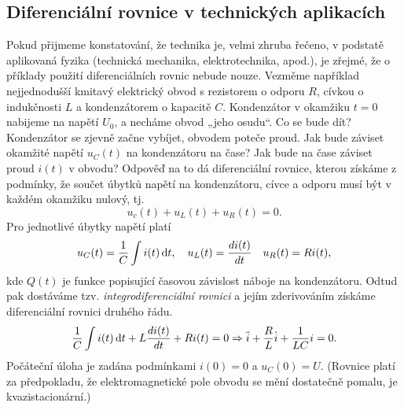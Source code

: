     \subsection{Diferenciální rovnice v technických aplikacích}
      Pokud přijmeme konstatování, že technika je, velmi zhruba řečeno, v podstatě aplikovaná fyzika
      (technická mechanika, elektrotechnika, apod.), je zřejmé, že o příklady použití
      diferenciálních rovnic nebude nouze. Vezměme například nejjednodušší kmitavý elektrický obvod
      s rezistorem o odporu \(R\), cívkou o indukčnosti \(L\) a kondenzátorem o kapacitě \(C\).
      Kondenzátor v okamžiku \(t = 0\) nabijeme na napětí \(U_0\), a necháme obvod „jeho osudu“. Co
      se bude dít? Kondenzátor se zjevně začne vybíjet, obvodem poteče proud. Jak bude záviset
      okamžité napětí \(u_C(t)\) na kondenzátoru na čase? Jak bude na čase záviset proud \(i(t)\) v
      obvodu? Odpověď na to dá diferenciální rovnice, kterou získáme z podmínky, že součet úbytků
      napětí na kondenzátoru, cívce a odporu musí být v každém okamžiku nulový, tj.
      \begin{equation*}
        u_c(t) + u_L(t) + u_R(t) = 0.
      \end{equation*}      
      Pro jednotlivé úbytky napětí platí
      \begin{gather*}
        u_C(t) = \dfrac{1}{C}\int i(t)\mathop{}\!\mathrm{d}t, \quad  u_L(t) = \dfrac{d i(t)}{d t} \quad u_R(t) = Ri(t),
      \end{gather*}
      kde \(Q(t)\) je funkce popisující časovou závislost náboje na kondenzátoru. Odtud pak 
      dostáváme tzv. \emph{integrodiferenciální rovnici} a jejím zderivováním získáme diferenciální 
      rovnici druhého řádu.
      \begin{equation*}
        \dfrac{1}{C}\int i(t)\mathop{}\!\mathrm{d}t + L\dfrac{d i(t)}{d t} + Ri(t) = 0 \Rightarrow
        \ddot{i} + \dfrac{R}{L}\dot{i} + \dfrac{1}{LC}i = 0.
      \end{equation*}
      Počáteční úloha je zadána podmínkami \(i(0) = 0\) a \(u_C(0) = U\). (Rovnice platí za 
      předpokladu, že elektromagnetické pole obvodu se mění dostatečně pomalu, je kvazistacionární.)
      
